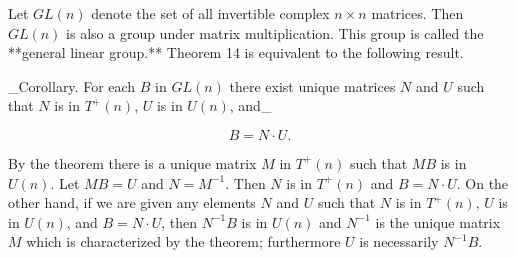 Let \(GL(n)\) denote the set of all invertible complex \(n\times n\) matrices. Then \(GL(n)\) is also a group under matrix multiplication. This group is called the **general linear group.** Theorem 14 is equivalent to the following result.

_Corollary. For each \(B\) in \(GL(n)\) there exist unique matrices \(N\) and \(U\) such that \(N\) is in \(T^{+}(n)\), \(U\) is in \(U(n)\), and_

\[B=N\cdot U.\]

By the theorem there is a unique matrix \(M\) in \(T^{+}(n)\) such that \(MB\) is in \(U(n)\). Let \(MB=U\) and \(N=M^{-1}\). Then \(N\) is in \(T^{+}(n)\) and \(B=N\cdot U\). On the other hand, if we are given any elements \(N\) and \(U\) such that \(N\) is in \(T^{+}(n)\), \(U\) is in \(U(n)\), and \(B=N\cdot U\), then \(N^{-1}B\) is in \(U(n)\) and \(N^{-1}\) is the unique matrix \(M\) which is characterized by the theorem; furthermore \(U\) is necessarily \(N^{-1}B\).

 